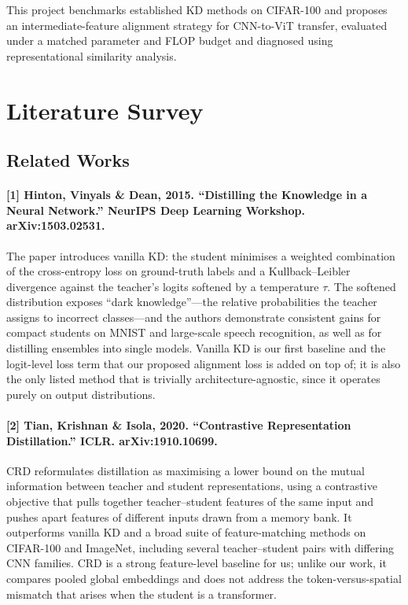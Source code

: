 \documentclass[11pt, letterpaper]{article}
\begin{document}
This project benchmarks established KD methods on CIFAR-100 and proposes an
intermediate-feature alignment strategy for CNN-to-ViT transfer, evaluated under
a matched parameter and FLOP budget and diagnosed using representational
similarity analysis.

\section{Literature Survey}

\subsection{Related Works}

\paragraph{[1] Hinton, Vinyals \& Dean, 2015. ``Distilling the Knowledge in a Neural Network.'' NeurIPS Deep Learning Workshop. arXiv:1503.02531.}
The paper introduces vanilla KD: the student minimises a weighted combination of
the cross-entropy loss on ground-truth labels and a Kullback--Leibler divergence
against the teacher's logits softened by a temperature $\tau$. The softened
distribution exposes ``dark knowledge''---the relative probabilities the teacher
assigns to incorrect classes---and the authors demonstrate consistent gains for
compact students on MNIST and large-scale speech recognition, as well as for
distilling ensembles into single models. Vanilla KD is our first baseline and
the logit-level loss term that our proposed alignment loss is added on top of;
it is also the only listed method that is trivially architecture-agnostic, since
it operates purely on output distributions.

\paragraph{[2] Tian, Krishnan \& Isola, 2020. ``Contrastive Representation Distillation.'' ICLR. arXiv:1910.10699.}
CRD reformulates distillation as maximising a lower bound on the mutual
information between teacher and student representations, using a contrastive
objective that pulls together teacher--student features of the same input and
pushes apart features of different inputs drawn from a memory bank. It
outperforms vanilla KD and a broad suite of feature-matching methods on
CIFAR-100 and ImageNet, including several teacher--student pairs with differing
CNN families. CRD is a strong feature-level baseline for us; unlike our work, it
compares pooled global embeddings and does not address the token-versus-spatial
mismatch that arises when the student is a transformer.
\end{document}
